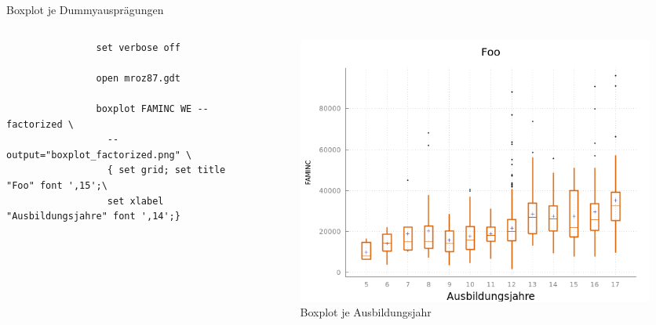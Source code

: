 \documentclass{beamer}[11pt]
\begin{document}
\begin{frame}[fragile]{Boxplot je Dummyausprägungen}
	\begin{columns}[T] %
		\scriptsize
		\begin{column}{.55\textwidth}
			\begin{verbatim}
				set verbose off

				open mroz87.gdt

				boxplot FAMINC WE --factorized \
				  --output="boxplot_factorized.png" \
				  { set grid; set title "Foo" font ',15';\
				  set xlabel "Ausbildungsjahre" font ',14';}
			\end{verbatim}
		\end{column}

		\begin{column}{.47\textwidth}
			\begin{figure}
				\includegraphics[width=1.0\textwidth]{../figures/boxplot_factorized.png}
				\caption{Boxplot je Ausbildungsjahr}
			\end{figure}
	  \end{column}
	\end{columns}
\end{frame}
\end{document}
